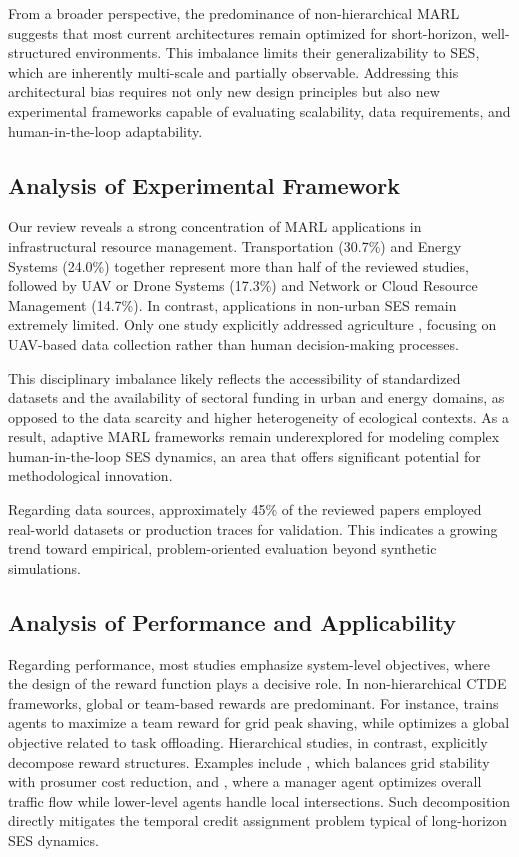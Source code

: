 \documentclass[conference]{IEEEtran}
\begin{document}
From a broader perspective, the predominance of non-hierarchical MARL suggests that most current architectures remain optimized for short-horizon, well-structured environments. This imbalance limits their generalizability to SES, which are inherently multi-scale and partially observable. Addressing this architectural bias requires not only new design principles but also new experimental frameworks capable of evaluating scalability, data requirements, and human-in-the-loop adaptability.

\subsection{Analysis of Experimental Framework}

Our review reveals a strong concentration of MARL applications in infrastructural resource management. Transportation (30.7\%) and Energy Systems (24.0\%) together represent more than half of the reviewed studies, followed by UAV or Drone Systems (17.3\%) and Network or Cloud Resource Management (14.7\%). In contrast, applications in non-urban SES remain extremely limited. Only one study explicitly addressed agriculture \cite{Xiong20253075}, focusing on UAV-based data collection rather than human decision-making processes.

This disciplinary imbalance likely reflects the accessibility of standardized datasets and the availability of sectoral funding in urban and energy domains, as opposed to the data scarcity and higher heterogeneity of ecological contexts. As a result, adaptive MARL frameworks remain underexplored for modeling complex human-in-the-loop SES dynamics, an area that offers significant potential for methodological innovation.

Regarding data sources, approximately 45\% of the reviewed papers employed real-world datasets or production traces for validation. This indicates a growing trend toward empirical, problem-oriented evaluation beyond synthetic simulations.

\subsection{Analysis of Performance and Applicability}

Regarding performance, most studies emphasize system-level objectives, where the design of the reward function plays a decisive role. In non-hierarchical CTDE frameworks, global or team-based rewards are predominant. For instance, \cite{rayyan-353822176} trains agents to maximize a team reward for grid peak shaving, while \cite{rayyan-353821831} optimizes a global objective related to task offloading. Hierarchical studies, in contrast, explicitly decompose reward structures. Examples include \cite{rayyan-353822026}, which balances grid stability with prosumer cost reduction, and \cite{rayyan-353822005}, where a manager agent optimizes overall traffic flow while lower-level agents handle local intersections. Such decomposition directly mitigates the temporal credit assignment problem typical of long-horizon SES dynamics.
\end{document}
